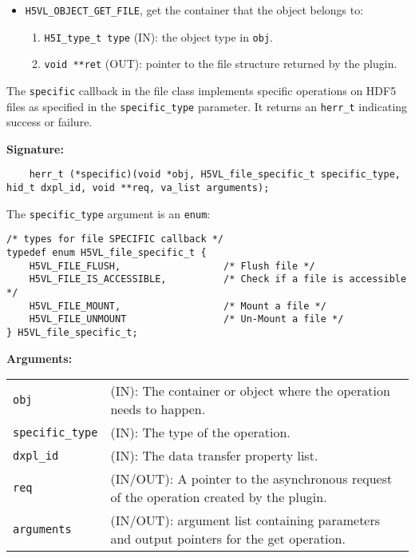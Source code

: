 \begin{mdframed}[style=bgbox]
\begin{itemize}
\item \texttt{H5VL\_OBJECT\_GET\_FILE}, get the container that the object
  belongs to:
  \begin{enumerate}
  \item \texttt{H5I\_type\_t type} (IN): the object type in \texttt{obj}.
  \item \texttt{void **ret} (OUT): pointer to the file structure returned
    by the plugin.
  \end{enumerate}
\end{itemize}
\end{mdframed}
The \texttt{specific} callback in the file class implements specific operations on HDF5 files as specified in the \texttt{specific\_type} parameter. It returns an \texttt{herr\_t} indicating success or failure.\bigskip

\begin{mdframed}[style=bgbox] 
\textbf{Signature:}
\begin{lstlisting}
    herr_t (*specific)(void *obj, H5VL_file_specific_t specific_type, hid_t dxpl_id, void **req, va_list arguments);
\end{lstlisting}

The \texttt{specific\_type} argument is an \texttt{enum}:
\begin{lstlisting}
/* types for file SPECIFIC callback */
typedef enum H5VL_file_specific_t {
    H5VL_FILE_FLUSH,                  /* Flush file */
    H5VL_FILE_IS_ACCESSIBLE,          /* Check if a file is accessible */
    H5VL_FILE_MOUNT,                  /* Mount a file */
    H5VL_FILE_UNMOUNT                 /* Un-Mount a file */
} H5VL_file_specific_t;
\end{lstlisting}

\textbf{Arguments:}\\
\begin{tabular}{l p{10cm}}
  \texttt{obj} & (IN): The container or object where the operation needs
  to happen.\\
  \texttt{specific\_type} & (IN): The type of the operation.\\
  \texttt{dxpl\_id} & (IN): The data transfer property list.\\
  \texttt{req} & (IN/OUT): A pointer to the asynchronous request of the
  operation created by the plugin.\\
  \texttt{arguments} & (IN/OUT): argument list containing parameters and
  output pointers for the get operation. \\
\end{tabular}


\end{mdframed}
